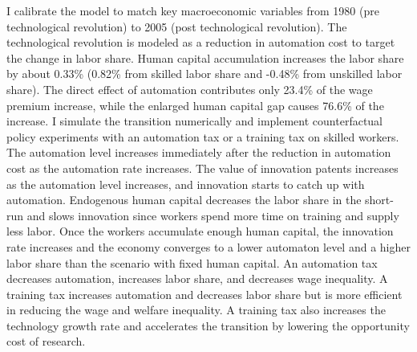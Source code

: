 \documentclass[12pt]{article}
\begin{document}
I calibrate the model to match key macroeconomic variables from 1980 (pre technological revolution) to 2005 (post technological revolution). The technological revolution is modeled as a reduction in automation cost to target the change in labor share. Human capital accumulation increases the labor share by about 0.33\% (0.82\% from skilled labor share and -0.48\% from unskilled labor share). The direct effect of automation contributes only 23.4\% of the wage premium increase, while the enlarged human capital gap causes 76.6\% of the increase. I simulate the transition numerically and implement counterfactual policy experiments with an automation tax or a training tax on skilled workers. The automation level increases immediately after the reduction in automation cost as the automation rate increases. The value of innovation patents increases as the automation level increases, and innovation starts to catch up with automation. Endogenous human capital decreases the labor share in the short-run and slows innovation since workers spend more time on training and supply less labor. Once the workers accumulate enough human capital, the innovation rate increases and the economy converges to a lower automaton level and a higher labor share than the scenario with fixed human capital. An automation tax decreases automation, increases labor share, and decreases wage inequality. A training tax increases automation and decreases labor share but is more efficient in reducing the wage and welfare inequality. A training tax also increases the technology growth rate and accelerates the transition by lowering the opportunity cost of research. 
\end{document}
